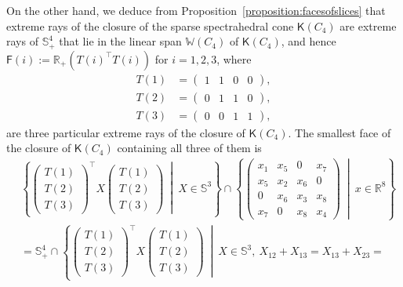 \documentclass[oneside]{amsart}
\theoremstyle{plain}
\theoremstyle{definition}
\theoremstyle{remark}
\numberwithin{equation}{section}
\begin{document}
\begin{enumerate}[label=(\roman*)]
On the other hand, we deduce from
Proposition~\ref{proposition:facesofslices} that extreme rays of the
closure of the sparse spectrahedral cone $\mathsf{K}(C_{4})$ are extreme
rays of $\mathbb{S}^{4}_{+}$ that lie in the linear span
$\mathbb{W}(C_{4})$ of $\mathsf{K}(C_{4})$, and hence $\mathsf{F}(i) :=
\mathbb{R}_+ (T(i)^{\top} T(i))$ for $i = 1, 2, 3$, where
\[
\begin{aligned}
T(1) &=
\begin{pmatrix}
1 & 1 & 0 & 0
\end{pmatrix},
\\
T(2) &=
\begin{pmatrix}
0 & 1 & 1 & 0
\end{pmatrix},
\\
T(3) &=
\begin{pmatrix}
0 & 0 & 1 & 1
\end{pmatrix},
\end{aligned}
\]
are three particular extreme rays of the closure of $\mathsf{K}(C_{4})$.
The smallest face of the closure of $\mathsf{K}(C_{4})$ containing all
three of them is
\[
\begin{split}
&\left\{
\begin{pmatrix}
T(1) \\ T(2) \\
T(3)
\end{pmatrix}^{\top}
X
\begin{pmatrix}
T(1) \\ T(2) \\
T(3)
\end{pmatrix}
\ \middle|\ X \in \mathbb{S}^{3}\right\} \cap \left\{
\begin{pmatrix}
x_{1} & x_{5} & 0 & x_{7}
\\
x_{5} & x_{2} & x_{6} & 0
\\
0 & x_{6} & x_{3} & x_{8}
\\
x_{7} & 0 & x_{8} & x_{4}
\end{pmatrix}
\ \middle|\ x \in \mathbb{R}^{8}\right\}
\\
&= \mathbb{S}^{4}_{+} \cap \left\{
\begin{pmatrix}
T(1) \\ T(2) \\
T(3)
\end{pmatrix}^{\top}
X
\begin{pmatrix}
T(1) \\ T(2) \\
T(3)
\end{pmatrix}
\ \middle|\ X \in \mathbb{S}^{3}, \ X_{12} + X_{13} = X_{13} + X_{23} =

\end{split}\]
\end{enumerate}
\end{document}
